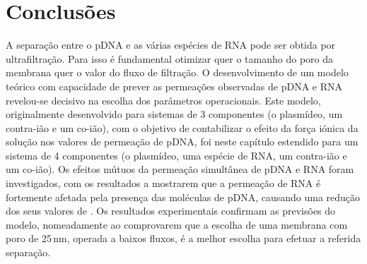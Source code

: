 \section{Conclusões} %
\label{sec:4art4}
A separação entre o pDNA e as várias espécies de RNA pode ser obtida por ultrafiltração. Para isso é fundamental otimizar quer o tamanho do poro da membrana quer o valor do fluxo de filtração. O desenvolvimento de um modelo teórico com capacidade de prever as permeações observadas de pDNA e RNA revelou-se decisivo na escolha dos parâmetros operacionais. Este modelo, originalmente desenvolvido para sistemas de 3 componentes (o plasmídeo, um contra-ião e um co-ião), com o objetivo de contabilizar o efeito da força iónica da solução nos valores de permeação de pDNA, foi neste capítulo estendido para um sistema de 4 componentes (o plasmídeo, uma espécie de RNA, um contra-ião e um co-ião). Os efeitos mútuos da permeação simultânea de pDNA e RNA foram investigados, com os resultados a mostrarem que a permeação de RNA é fortemente afetada pela presença das moléculas de pDNA, causando uma redução dos seus valores de \permobs. Os resultados experimentais confirmam as previsões do modelo, nomeadamente ao comprovarem que a escolha de uma membrana com poro de 25\,nm, operada a baixos fluxos, é a melhor escolha para efetuar a referida separação. 


